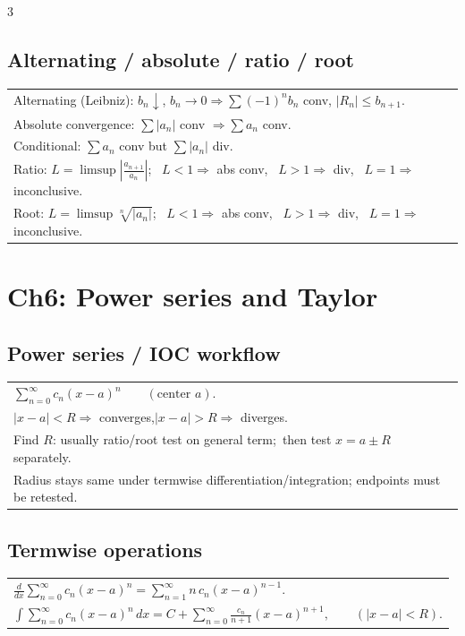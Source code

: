 \documentclass[10pt]{article}
\begin{document}
\begin{multicols}{3}
\subsection*{Alternating / absolute / ratio / root}
\begin{tabular}{@{}p{}@{}}
Alternating (Leibniz): $b_n\downarrow$, $b_n\to0 \Rightarrow \sum(-1)^n b_n$ conv, \quad $|R_n|\le b_{n+1}$.\\
Absolute convergence: $\displaystyle\sum |a_n|$ conv $\Rightarrow \sum a_n$ conv.\\
Conditional: $\displaystyle\sum a_n$ conv but $\sum|a_n|$ div.\\
Ratio: $L=\displaystyle\limsup\left|\frac{a_{n+1}}{a_n}\right|$; \ $L<1\Rightarrow$ abs conv, \ $L>1\Rightarrow$ div, \ $L=1\Rightarrow$ inconclusive.\\
Root: $L=\displaystyle\limsup \sqrt[n]{|a_n|}$; \ $L<1\Rightarrow$ abs conv, \ $L>1\Rightarrow$ div, \ $L=1\Rightarrow$ inconclusive.\\
\end{tabular}
\section*{Ch6: Power series and Taylor}

\subsection*{Power series / IOC workflow}
\begin{tabular}{@{}p{}@{}}
$\displaystyle\sum_{n=0}^{\infty} c_n(x-a)^n \qquad (\text{center }a).$\\
$|x-a|<R \Rightarrow$ converges,\qquad $|x-a|>R \Rightarrow$ diverges.\\
Find $R$: usually ratio/root test on general term;\ then test $x=a\pm R$ separately.\\
Radius stays same under termwise differentiation/integration; endpoints must be retested.\\
\end{tabular}

\subsection*{Termwise operations}
\begin{tabular}{@{}p{}@{}}
$\displaystyle \frac{d}{dx}\sum_{n=0}^{\infty} c_n(x-a)^n=\sum_{n=1}^{\infty} n\,c_n(x-a)^{n-1}.$\\
$\displaystyle \int \sum_{n=0}^{\infty} c_n(x-a)^n\,dx
=C+\sum_{n=0}^{\infty}\frac{c_n}{n+1}(x-a)^{n+1},
\qquad (|x-a|<R).$\\
\end{tabular}


\end{multicols}
\end{document}
